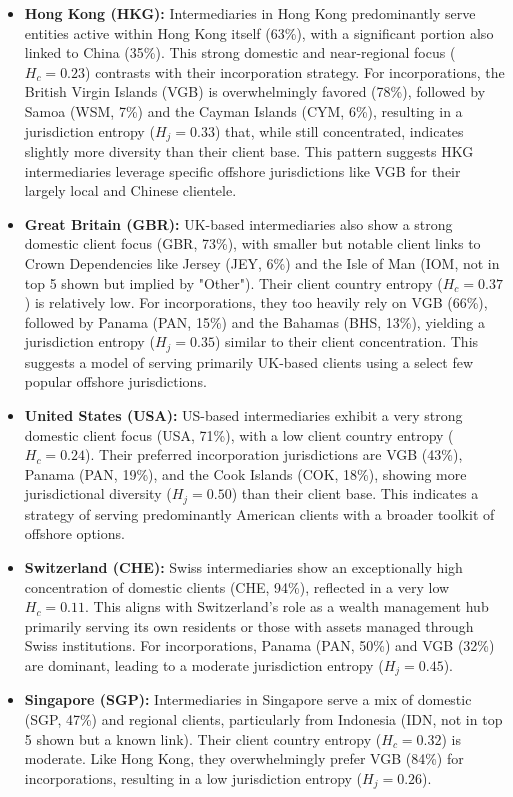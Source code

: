 \begin{itemize}
    \item \textbf{Hong Kong (HKG):} Intermediaries in Hong Kong predominantly serve entities active within Hong Kong itself (63\%), with a significant portion also linked to China (35\%). This strong domestic and near-regional focus ($H_c=0.23$) contrasts with their incorporation strategy. For incorporations, the British Virgin Islands (VGB) is overwhelmingly favored (78\%), followed by Samoa (WSM, 7\%) and the Cayman Islands (CYM, 6\%), resulting in a jurisdiction entropy ($H_j=0.33$) that, while still concentrated, indicates slightly more diversity than their client base. This pattern suggests HKG intermediaries leverage specific offshore jurisdictions like VGB for their largely local and Chinese clientele.

    \item \textbf{Great Britain (GBR):} UK-based intermediaries also show a strong domestic client focus (GBR, 73\%), with smaller but notable client links to Crown Dependencies like Jersey (JEY, 6\%) and the Isle of Man (IOM, not in top 5 shown but implied by "Other"). Their client country entropy ($H_c=0.37$) is relatively low. For incorporations, they too heavily rely on VGB (66\%), followed by Panama (PAN, 15\%) and the Bahamas (BHS, 13\%), yielding a jurisdiction entropy ($H_j=0.35$) similar to their client concentration. This suggests a model of serving primarily UK-based clients using a select few popular offshore jurisdictions.

    \item \textbf{United States (USA):} US-based intermediaries exhibit a very strong domestic client focus (USA, 71\%), with a low client country entropy ($H_c=0.24$). Their preferred incorporation jurisdictions are VGB (43\%), Panama (PAN, 19\%), and the Cook Islands (COK, 18\%), showing more jurisdictional diversity ($H_j=0.50$) than their client base. This indicates a strategy of serving predominantly American clients with a broader toolkit of offshore options.

    \item \textbf{Switzerland (CHE):} Swiss intermediaries show an exceptionally high concentration of domestic clients (CHE, 94\%), reflected in a very low $H_c=0.11$. This aligns with Switzerland's role as a wealth management hub primarily serving its own residents or those with assets managed through Swiss institutions. For incorporations, Panama (PAN, 50\%) and VGB (32\%) are dominant, leading to a moderate jurisdiction entropy ($H_j=0.45$).

    \item \textbf{Singapore (SGP):} Intermediaries in Singapore serve a mix of domestic (SGP, 47\%) and regional clients, particularly from Indonesia (IDN, not in top 5 shown but a known link). Their client country entropy ($H_c=0.32$) is moderate. Like Hong Kong, they overwhelmingly prefer VGB (84\%) for incorporations, resulting in a low jurisdiction entropy ($H_j=0.26$).
\end{itemize}

